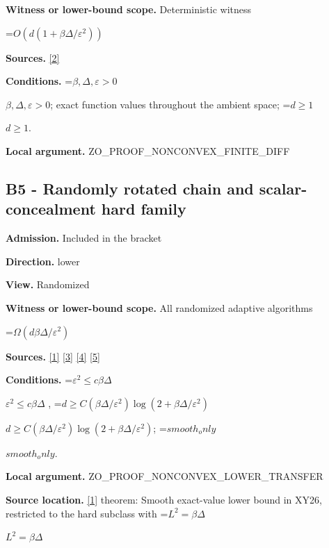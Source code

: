 \documentclass[10pt,a4paper]{article}
\newcommand{\AtlasMath}[1]{\par\begingroup\centering\setbox0=\hbox{$\displaystyle #1$}\ifdim\wd0>1.4\linewidth\typeout{ATLAS WIDE FORMULA: \the\wd0}\fi\ifdim\wd0>\linewidth\resizebox{\linewidth}{!}{\box0}\else\box0\fi\par\endgroup}
\newcommand{\AtlasInlineMath}[1]{\begingroup\setbox0=\hbox{$#1$}\ifdim\wd0>.4\linewidth\endgroup\AtlasMath{#1}\else\endgroup$#1$\fi}
\begin{document}
\textbf{Witness or lower-bound scope.} Deterministic witness



\AtlasMath{O(d(1+\beta\Delta/\varepsilon^2))}


\textbf{Sources.} \href{https://arxiv.org/pdf/1309.5549}{[2]}



\textbf{Conditions.} \AtlasInlineMath{\beta ,\Delta ,\varepsilon >0}; exact function values throughout the ambient space; \AtlasInlineMath{d\ge 1}.



\textbf{Local argument.} ZO\_PROOF\_NONCONVEX\_FINITE\_DIFF



\subsection{B5 - Randomly rotated chain and scalar-concealment hard family}


\textbf{Admission.} Included in the bracket



\textbf{Direction.} lower



\textbf{View.} Randomized



\textbf{Witness or lower-bound scope.} All randomized adaptive algorithms



\AtlasMath{\Omega(d\beta\Delta/\varepsilon^2)}


\textbf{Sources.} \href{https://arxiv.org/html/2610.19652v1}{[1]} \href{https://arxiv.org/html/2609.00045v3}{[3]} \href{https://arxiv.org/pdf/2610.00245v2}{[4]} \href{https://arxiv.org/html/2610.17074v1}{[5]}



\textbf{Conditions.} \AtlasInlineMath{\varepsilon ^2\le c\beta \Delta} , \AtlasInlineMath{d\ge C(\beta \Delta /\varepsilon ^2)\log(2+\beta \Delta /\varepsilon ^2)}; \AtlasInlineMath{smooth_only}.



\textbf{Local argument.} ZO\_PROOF\_NONCONVEX\_LOWER\_TRANSFER



\textbf{Source location.} \href{https://arxiv.org/html/2610.19652v1}{[1]} theorem: Smooth exact-value lower bound in XY26, restricted to the hard subclass with \AtlasInlineMath{L^2=\beta\Delta}
\end{document}
